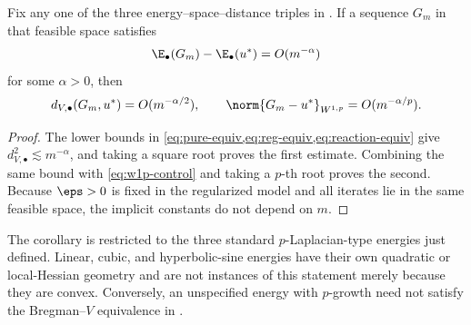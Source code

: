\begin{corollary}
\label{cor:metric-rates}
Fix any one of the three energy--space--distance triples in . If a sequence
\(G_m\) in that feasible space satisfies
 \begin{equation}
 \E_\bullet(G_m)-\E_\bullet(u^*)=O(m^{-\alpha})
 \label{eq:assumed-energy-rate}
 \end{equation}
for some \(\alpha>0\), then
 \begin{equation}
 d_{V,\bullet}(G_m,u^*)=O(m^{-\alpha/2}),
 \qquad
 \norm{G_m-u^*}_{W^{1,p}}=O(m^{-\alpha/p}).
\label{eq:metric-rates}
 \end{equation}
\end{corollary}

\begin{proof}
The lower bounds in \cref{eq:pure-equiv,eq:reg-equiv,eq:reaction-equiv} give
\(d_{V,\bullet}^2\lesssim m^{-\alpha}\), and taking a square root proves the first estimate. Combining
the same bound with \cref{eq:w1p-control} and taking a \(p\)-th root proves the second. Because
\(\eps>0\) is fixed in the regularized model and all iterates lie in the same feasible space, the
implicit constants do not depend on \(m\).
\end{proof}

\begin{remark}[Scope]
The corollary is restricted to the three standard \(p\)-Laplacian-type energies just defined. Linear,
cubic, and hyperbolic-sine energies have their own quadratic or local-Hessian geometry and are not
instances of this statement merely because they are convex. Conversely, an unspecified energy with
\(p\)-growth need not satisfy the Bregman--\(V\) equivalence in .
\end{remark}
